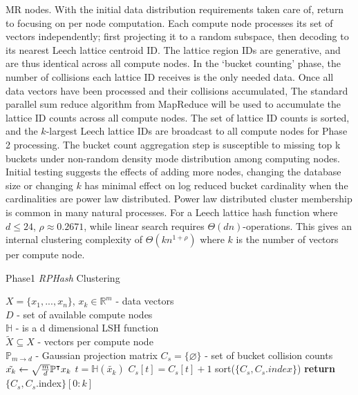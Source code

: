 \documentclass[a4paper,10pt]{article}
\begin{document}
MR nodes.  With the initial data distribution requirements taken care of,
return to focusing on per node computation.  Each compute node processes
its set of vectors independently; first projecting it to a random subspace,
then decoding to its nearest Leech lattice centroid ID.  The lattice region
IDs are generative, and are thus identical across all compute nodes.  In the
`bucket counting' phase, the number of collisions each lattice ID receives
is the only needed data.  Once all data vectors have been processed and
their collisions accumulated, The standard parallel sum reduce algorithm
from MapReduce will be used to accumulate the lattice ID counts across all
compute nodes.	The set of lattice ID counts is sorted, and the $k$-largest
Leech lattice IDs are broadcast to all compute nodes for Phase 2 processing.
The bucket count aggregation step is susceptible to missing top k buckets
under non-random density mode distribution among computing nodes.  Initial
testing suggests the effects of adding more nodes, changing the database
size or changing $k$ has minimal effect on log reduced bucket cardinality
when the cardinalities are power law distributed.  Power law distributed
cluster membership is common in many natural processes\cite{reed2002}.
For a Leech lattice hash function where $d \leq24$,
$\rho \approx 0.2671 $\cite{Andoni}, while linear search requires $\Theta(d
n)$-operations.  This gives an internal clustering complexity of $\Theta(k
n^{1+\rho} )$ where $k$ is the number of vectors per compute node.



\begin{algorithm}
\caption{Phase1 \emph{RPHash} Clustering}\label{Phase1}
\begin{algorithmic}[1]
\REQUIRE $X=\{x_1,...,x_n\}$, $x_k \in \mathbb{R}^m$ - data vectors\\
 $D$ - set of available compute nodes\\
$\mathbb{H}$ - is a d dimensional LSH function\\
 $\widetilde{X} \subseteq X$ - vectors per compute node\\
 $\mathbb{P}_{m\rightarrow d}$ - Gaussian projection matrix
\STATE $C_s=\{\varnothing\}$ - set of bucket collision counts
\STATE $\tilde{x_k}\leftarrow \sqrt{{m}\over{d}}\mathbb{P}^{\intercal}x_k $
\STATE $t = \mathbb{H}(\tilde{x_k})$
\STATE $C_s[t]=C_s[t]+1$
\ENDFOR
\STATE sort($\{C_s,C_s.index\}$)
\State \textbf{return}$\{C_s,C_s$.index$\} [0 : k]$
\end{algorithmic}
\end{algorithm}
\end{document}

